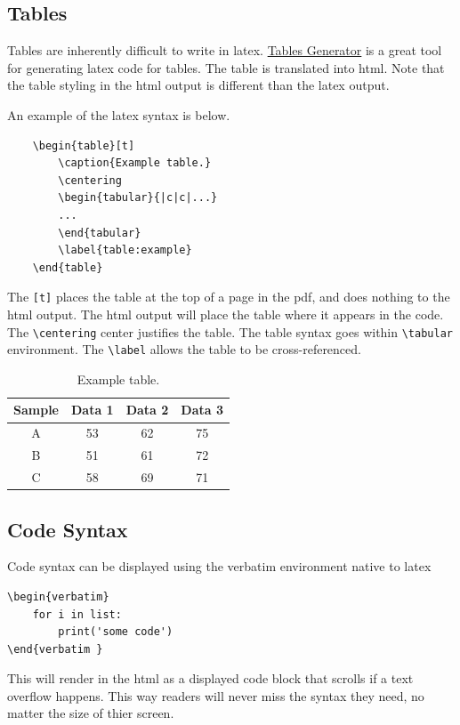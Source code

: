 \documentclass{article}
\begin{document}
\subsection{Tables}
Tables are inherently difficult to write in latex. \href{https://www.tablesgenerator.com/}{Tables Generator} is a great tool for generating latex code for tables. The table is translated into html. Note that the table styling in the html output is different than the latex output. 

An example of the latex syntax is below.
\begin{verbatim}
    \begin{table}[t]
        \caption{Example table.}
        \centering
        \begin{tabular}{|c|c|...}
        ...
        \end{tabular}
        \label{table:example}
    \end{table}
\end{verbatim}

The \verb'[t]' places the table at the top of a page in the pdf, and does nothing to the html output. The html output will place the table where it appears in the code. The \verb'\centering' center justifies the table. The table syntax goes within \verb'\tabular' environment. The \verb'\label' allows the table to be cross-referenced. 

\begin{table}[t]
    \caption{Example table.}
    \centering
    \begin{tabular}{|c|c|c|c|}
    \hline
    \multicolumn{1}{|l|}{Sample} & \multicolumn{1}{l|}{Data 1} & \multicolumn{1}{l|}{Data  2} & \multicolumn{1}{l|}{Data 3} \\ \hline
    A                            & 53                          & 62                           & 75                          \\ \hline
    B                            & 51                          & 61                           & 72                          \\ \hline
    C                            & 58                          & 69                           & 71                          \\ \hline
    \end{tabular}
    \label{table:example}
\end{table}

\subsection{Code Syntax}
Code syntax can be displayed using the verbatim environment native to latex 
\begin{verbatim}
\begin{verbatim}
    for i in list:
        print('some code')
\end{verbatim } 
\end{verbatim}
This will render in the html as a displayed code block that scrolls if a text overflow happens. This way readers will never miss the syntax they need, no matter the size of thier screen.
\end{document}
